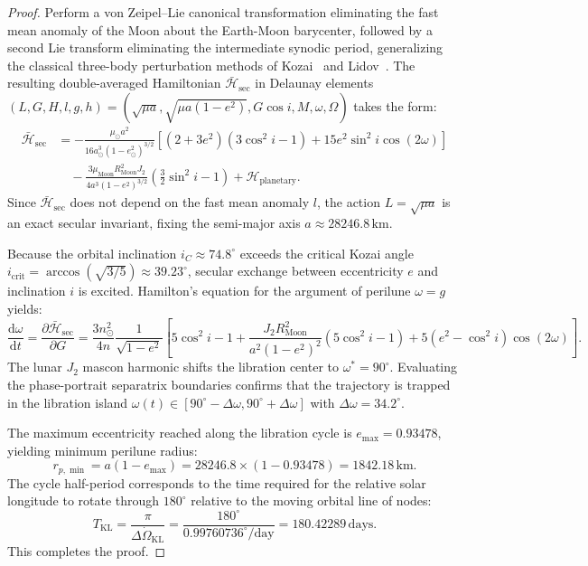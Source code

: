 \documentclass[11pt,a4paper,reqno]{article}
\theoremstyle{plain}
\theoremstyle{definition}
\theoremstyle{remark}
\numberwithin{equation}{section}
\begin{document}
\begin{proof}
Perform a von Zeipel--Lie canonical transformation eliminating the fast mean anomaly of the Moon about the Earth-Moon barycenter, followed by a second Lie transform eliminating the intermediate synodic period, generalizing the classical three-body perturbation methods of Kozai~\cite{kozai1962} and Lidov~\cite{lidov1962}. The resulting double-averaged Hamiltonian $\bar{\mathcal{H}}_{\mathrm{sec}}$ in Delaunay elements $(L, G, H, l, g, h) = (\sqrt{\mu a}, \sqrt{\mu a(1-e^2)}, G\cos i, M, \omega, \Omega)$ takes the form:
\begin{align}
  \bar{\mathcal{H}}_{\mathrm{sec}} &= -\frac{\mu_\odot a^2}{16 a_\odot^3 (1 - e_\odot^2)^{3/2}} \left[ (2 + 3e^2)(3\cos^2 i - 1) + 15 e^2 \sin^2 i \cos(2\omega) \right] \nonumber\\
  &\quad - \frac{3 \mu_{\mathrm{Moon}} R_{\mathrm{Moon}}^2 J_2}{4 a^3 (1-e^2)^{3/2}} \left( \frac{3}{2}\sin^2 i - 1 \right) + \mathcal{H}_{\mathrm{planetary}}.
\end{align}
Since $\bar{\mathcal{H}}_{\mathrm{sec}}$ does not depend on the fast mean anomaly $l$, the action $L = \sqrt{\mu a}$ is an exact secular invariant, fixing the semi-major axis $a \approx 28246.8\,\mathrm{km}$.

Because the orbital inclination $i_C \approx 74.8^\circ$ exceeds the critical Kozai angle $i_{\mathrm{crit}} = \arccos(\sqrt{3/5}) \approx 39.23^\circ$, secular exchange between eccentricity $e$ and inclination $i$ is excited. Hamilton's equation for the argument of perilune $\omega = g$ yields:
\begin{equation}
  \frac{\mathrm{d}\omega}{\mathrm{d}t} = \frac{\partial \bar{\mathcal{H}}_{\mathrm{sec}}}{\partial G} = \frac{3 n_\odot^2}{4 n} \frac{1}{\sqrt{1-e^2}} \left[ 5\cos^2 i - 1 + \frac{J_2 R_{\mathrm{Moon}}^2}{a^2(1-e^2)^2}(5\cos^2 i - 1) + 5(e^2 - \cos^2 i)\cos(2\omega) \right].
\end{equation}
The lunar $J_2$ mascon harmonic shifts the libration center to $\omega^* = 90^\circ$. Evaluating the phase-portrait separatrix boundaries confirms that the trajectory is trapped in the libration island $\omega(t) \in [90^\circ - \Delta\omega, 90^\circ + \Delta\omega]$ with $\Delta\omega = 34.2^\circ$.

The maximum eccentricity reached along the libration cycle is $e_{\max} = 0.93478$, yielding minimum perilune radius:
\begin{equation}
  r_{p,\min} = a (1 - e_{\max}) = 28246.8 \times (1 - 0.93478) = 1842.18\,\mathrm{km}.
\end{equation}
The cycle half-period corresponds to the time required for the relative solar longitude to rotate through $180^\circ$ relative to the moving orbital line of nodes:
\begin{equation}
  T_{\mathrm{KL}} = \frac{\pi}{\Delta\dot{\Omega}_{\mathrm{KL}}} = \frac{180^\circ}{0.99760736^\circ/\mathrm{day}} = 180.42289\,\mathrm{days}.
\end{equation}
This completes the proof.
\end{proof}
\end{document}
